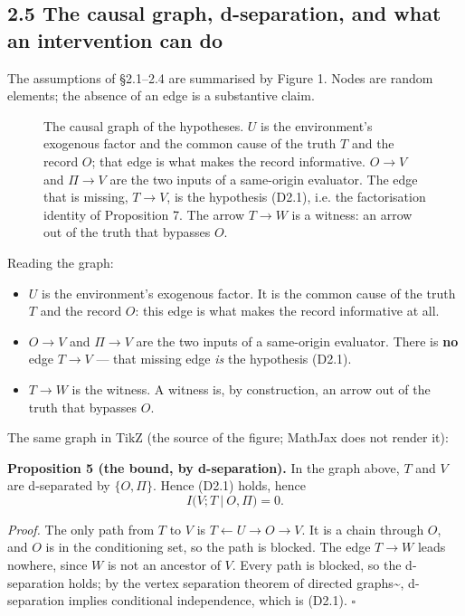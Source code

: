 \documentclass[11pt,a4paper]{article}
\providecommand{\tightlist}{\setlength{\itemsep}{0pt}\setlength{\parskip}{0pt}}
\begin{document}
\subsection{2.5 The causal graph, d-separation, and what an intervention can do}\label{the-causal-graph-d-separation-and-what-an-intervention-can-do}

The assumptions of §2.1--2.4 are summarised by Figure 1. Nodes are random
elements; the absence of an edge is a substantive claim.

\begin{figure}[H]
\centering

\caption{The causal graph of the hypotheses. $U$ is the environment's
exogenous factor and the common cause of the truth $T$ and the record $O$;
that edge is what makes the record informative. $O\to V$ and $\Pi\to V$
are the two inputs of a same-origin evaluator. The edge that is missing,
$T\to V$, is the hypothesis (D2.1), i.e. the factorisation identity of Proposition 7. The arrow
$T\to W$ is a witness: an arrow out of the truth that bypasses $O$.}
\label{fig:dag}
\end{figure}


Reading the graph:

\begin{itemize}
\tightlist
\item
  \(U\) is the environment's exogenous factor. It is the common cause of the truth
  \(T\) and the record \(O\): this edge is what makes the record informative at all.
\item
  \(O\to V\) and \(\Pi\to V\) are the two inputs of a same-origin evaluator. There is
  \textbf{no} edge \(T\to V\) --- that missing edge \emph{is} the hypothesis (D2.1).
\item
  \(T\to W\) is the witness. A witness is, by construction, an arrow out of the
  truth that bypasses \(O\).
\end{itemize}

The same graph in TikZ (the source of the figure; MathJax does not
render it):

\textbf{Proposition 5 (the bound, by d-separation).} In the graph above, \(T\) and \(V\)
are d-separated by \(\{O,\Pi\}\). Hence (D2.1) holds, hence
\begin{equation}
I\big(V;T\ \big|\ O,\Pi\big)=0 .
\tag{2.5.1}
\end{equation}

\emph{Proof.} The only path from \(T\) to \(V\) is \(T\leftarrow U\to O\to V\). It is a chain
through \(O\), and \(O\) is in the conditioning set, so the path is blocked. The edge
\(T\to W\) leads nowhere, since \(W\) is not an ancestor of \(V\). Every path is
blocked, so the d-separation holds; by the vertex separation theorem of directed
graphs\textasciitilde{}\cite{pearl2009causality}, d-separation implies conditional independence,
which is (D2.1).
\(\square\)
\end{document}
